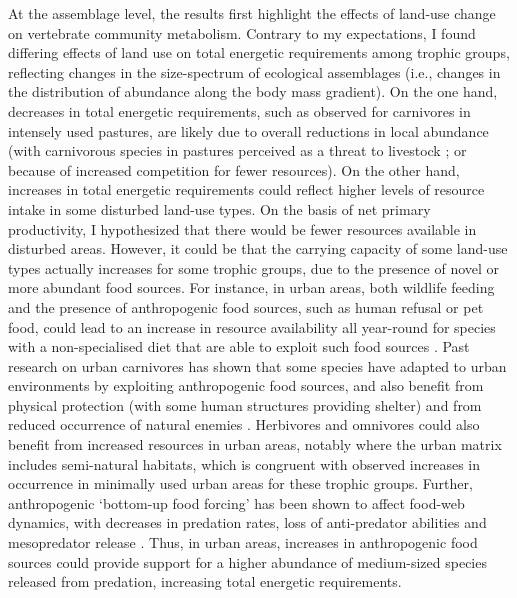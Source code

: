 At the assemblage level, the results first highlight the effects of land-use change on vertebrate community metabolism. Contrary to my expectations, I found differing effects of land use on total energetic requirements among trophic groups, reflecting changes in the size-spectrum of ecological assemblages (i.e., changes in the distribution of abundance along the body mass gradient). On the one hand, decreases in total energetic requirements, such as observed for carnivores in intensely used pastures, are likely due to overall reductions in local abundance (with carnivorous species in pastures perceived as a threat to livestock \citep{VanEeden2018}; or because of increased competition for fewer resources). On the other hand, increases in total energetic requirements could reflect higher levels of resource intake in some disturbed land-use types. On the basis of net primary productivity, I hypothesized that there would be fewer resources available in disturbed areas. However, it could be that the carrying capacity of some land-use types actually increases for some trophic groups, due to the presence of novel or more abundant food sources. For instance, in urban areas, both wildlife feeding and the presence of anthropogenic food sources, such as human refusal or pet food, could lead to an increase in resource availability all year-round for species with a non-specialised diet that are able to exploit such food sources \citep{Fischer2012}.
Past research on urban carnivores has shown that some species have adapted to urban environments by exploiting anthropogenic food sources, and also benefit from physical protection (with some human structures providing shelter) and from reduced occurrence of natural enemies \citep{Bateman2012}. Herbivores and omnivores could also benefit from increased resources in urban areas, notably where the urban matrix includes semi-natural habitats, which is congruent with observed increases in occurrence in minimally used urban areas for these trophic groups. Further, anthropogenic `bottom-up food forcing' has been shown to affect food-web dynamics, with decreases in predation rates, loss of anti-predator abilities \citep{Geffroy2020} and mesopredator release \citep{Fischer2012}.  Thus, in urban areas, increases in anthropogenic food sources could provide support for a higher abundance of medium-sized species released from predation, increasing total energetic requirements.

